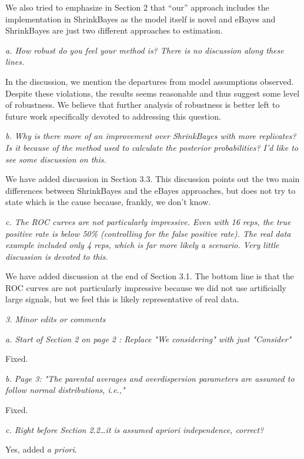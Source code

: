 \documentclass{article}
\newcommand{\comment}[1]{\textit{#1}}
\newcommand{\response}[1]{#1}
\begin{document}
\response{We also tried to emphasize in Section 2 that ``our'' approach includes the implementation in ShrinkBayes as the model itself is novel and eBayes and ShrinkBayes are just two different approaches to estimation.}

\comment{a. How robust do you feel your method is?  There is no discussion along these lines.}

\response{In the discussion, we mention the departures from model assumptions observed. Despite these violations, the results seems reasonable and thus suggest some level of robustness. We believe that further analysis of robustness is better left to future work specifically devoted to addressing this question.}

\comment{b.      Why is there more of an improvement over ShrinkBayes with more replicates?  Is it because of the method used to calculate the posterior probabilities?  I'd like to see some discussion on this.}

\response{We have added discussion in Section 3.3. This discussion points out the two main differences between ShrinkBayes and the eBayes approaches, but does not try to state which is the cause because, frankly, we don't know.}

\comment{c.      The ROC curves are not particularly impressive.  Even with 16 reps, the true positive rate is below 50\% (controlling for the false positive rate).  The real data example included only 4 reps, which is far more likely a scenario.  Very little discussion is devoted to this.}

\response{We have added discussion at the end of Section 3.1. The bottom line is that the ROC curves are not particularly impressive because we did not use artificially large signals, but we feel this is likely representative of real data.}

\comment{3.      Minor edits or comments}

\comment{a.      Start of Section 2 on page 2  :  Replace "We considering" with just "Consider"}

\response{Fixed.}

\comment{b.      Page 3: "The parental averages and overdispersion parameters are assumed to follow normal distributions, i.e.,"}

\response{Fixed.}

\comment{c.      Right before Section 2.2…it is assumed apriori independence, correct?}

\response{Yes, added \emph{a priori}.}
\end{document}
